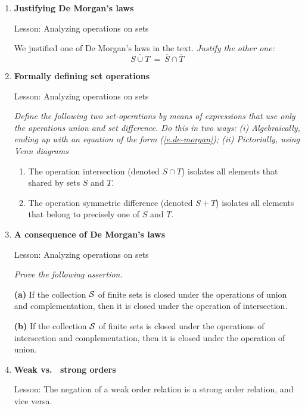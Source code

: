 {\begin{enumerate}
\medskip\item
{\bf Justifying De Morgan's laws}

{\sc Lesson:} Analyzing operations on sets

\smallskip 

We justified one of De Morgan's laws in the text.  {\em Justify the other one:}
\[ \overline{S \cup T} \ = \ \overline{S} \cap \overline{T} \]

\medskip\item
{\bf Formally defining set operations}

{\sc Lesson:} Analyzing operations on sets

\smallskip 

{\em Define the following two set-operations by means of expressions that use only the operations {\sc union} and {\sc set difference}.  Do this in two ways: (i) Algebraically, ending up with an equation of the form (\ref{e.de-morgan}); (ii) Pictorially, using Venn diagrams }
  \begin{enumerate}
  \item
The operation {\sc intersection} (denoted $S \cap T$) isolates all elements that shared by sets $S$ and $T$.
  \medskip\item
The operation {\sc symmetric difference} (denoted $S+T$) isolates all elements that belong to precisely one of $S$ and $T$.
  \end{enumerate}
  
\medskip\item
{\bf A consequence of De Morgan's laws}

{\sc Lesson:} Analyzing operations on sets

\smallskip

{\em Prove the following assertion.}

\begin{prop}
{\bf (a)}
If the collection $\cal S$ of finite sets is closed under the operations of union and complementation, then it is closed under the operation of intersection.

{\bf (b)}
If the collection $\cal S$ of finite sets is closed under the operations of intersection and complementation, then it is closed under the operation of union.
\end{prop}

\medskip\item
{\bf Weak vs.~ strong orders}

{\sc Lesson:} The negation of a weak order relation is a strong order relation, and vice versa.


\end{enumerate}}
